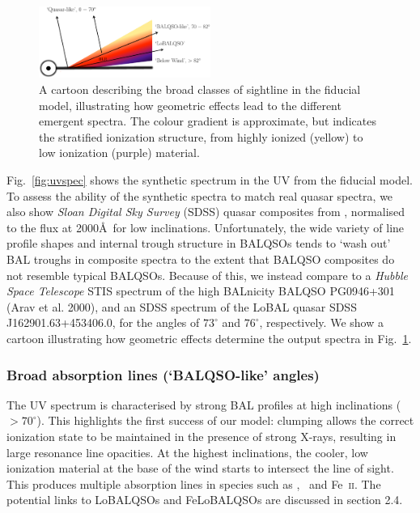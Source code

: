 \documentclass[useAMS,usenatbib]{mn2e_x}
\begin{document}
\begin{figure} 
\centering
\includegraphics[width=0.5\textwidth]{figures/fig4.eps}
\caption
{
A cartoon describing the broad classes of sightline 
in the fiducial model, illustrating how geometric effects lead to 
the different emergent spectra. The colour gradient is approximate,
but indicates the stratified ionization structure, 
from highly ionized (yellow) to low ionization (purple) material.
}
\label{fig:sightline}
\end{figure} 

\noindent
Fig.~\ref{fig:uvspec} shows the synthetic spectrum in the UV from the fiducial model. 
To assess the ability of the synthetic spectra to match real 
quasar spectra, we also show {\sl Sloan Digital Sky Survey} (SDSS) quasar
composites from \cite{reichard2003}, normalised to the flux at 2000\AA\
for low inclinations. Unfortunately, the wide variety of
line profile shapes and internal trough structure in BALQSOs
tends to `wash out' BAL troughs in composite spectra
to the extent that BALQSO composites do not resemble typical BALQSOs.
Because of this, we instead compare to a {\sl Hubble Space Telescope} 
STIS spectrum of the high BALnicity BALQSO PG0946+301 (Arav et al. 2000),
and an SDSS spectrum of the LoBAL quasar SDSS J162901.63+453406.0,
for the angles of $73^\circ$ and $76^\circ$, respectively. 
We show a cartoon illustrating how geometric effects determine
the output spectra in Fig.~\ref{fig:sightline}.  

\subsubsection{Broad absorption lines (`BALQSO-like' angles)}

The UV spectrum is characterised by strong BAL 
profiles at high inclinations ($> 70^\circ$). 
This highlights the first success of our model: 
clumping allows the correct ionization state 
to be maintained in the presence of strong X-rays, 
resulting in large resonance line opacities. 
At the highest inclinations, the 
cooler, low ionization material at the base of the wind
starts to intersect the line of sight. This produces 
multiple absorption lines in species such as \mg,
\al\ and Fe~\textsc{ii}. The potential links to LoBALQSOs and 
FeLoBALQSOs are discussed in section 2.4.
\end{document}

